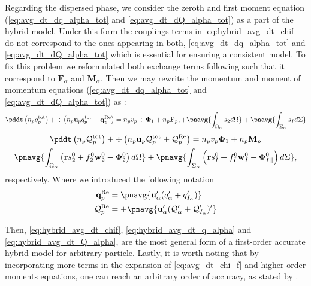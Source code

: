 Regarding the dispersed phase, we consider the zeroth and first moment equation (\ref{eq:avg_dt_dq_alpha_tot} and \ref{eq:avg_dt_dQ_alpha_tot}) as  a part of the hybrid model.
Under this form the couplings terms in \ref{eq:hybrid_avg_dt_chif} do not correspond to the ones appearing in both, \ref{eq:avg_dt_dq_alpha_tot} and \ref{eq:avg_dt_dQ_alpha_tot} which is essential for ensuring a consistent model. 
To fix this problem we reformulated both exchange terms following \citet{zhang1997momentum} such that it correspond to $\mathbf{F}_\alpha$ and $\textbf{M}_\alpha$. 
Then we may rewrite the momentum and moment of momentum equations (\ref{eq:avg_dt_dq_alpha_tot} and \ref{eq:avg_dt_dQ_alpha_tot}) as : 
\begin{multline}
    \pddt \left(n_p q_p^\text{tot}\right)
    + \div \left(n_p\textbf{u}_p
    q_p^\text{tot} + 
    \textbf{q}_p^\text{Re}
    \right)
    = 
    n_p v_p  \div \mathbf{\Phi}_1 
    + n_p \textbf{F}_p,
    + \pnavg{\int_{\Omega_\alpha} s_2 d\Omega}
    + \pnavg{\int_{\Sigma_\alpha} s_I d\Sigma}
    \label{eq:hybrid_avg_dt_q_alpha}
\end{multline}
\begin{multline}
    \pddt \left(n_p \mathcal{Q}_p^\text{tot}\right)
    + \div \left(
        n_p \textbf{u}_p \mathcal{Q}_p^\text{tot}
    + \mathcal{Q}_p^\text{Re}
    \right)
    =
    n_p v_p \mathbf{\Phi}_1 
    + n_p \textbf{M}_p\\
    \pnavg{\int_{\Omega_\alpha} \left(
        \textbf{r} s_2^0         
        + f_2^0  \textbf{w}_2^0 
        - \mathbf{\Phi}_2^0
        \right) d\Omega}
        + \pnavg{\int_{\Sigma_\alpha} \left(
        \textbf{r}s_I^0
        + f_I^0 \textbf{w}_I^0
        - \mathbf{\Phi}_{I||}^0
    \right) d\Sigma},
    \label{eq:hybrid_avg_dt_Q_alpha}
\end{multline}
respectively. 
Where  we introduced the following notation
\begin{align*}
    \textbf{q}_p^\text{Re}
    &= 
    \pnavg{\textbf{u}_\alpha'(q_\alpha'+q_{I_\alpha}')} \\
    \mathcal{Q}_p^\text{Re}
    &= 
    + \pnavg{\textbf{u}_\alpha'(\mathcal{Q}_\alpha'+\mathcal{Q}_{I_\alpha}')'}
\end{align*}

Then, \ref{eq:hybrid_avg_dt_chif}, \ref{eq:hybrid_avg_dt_q_alpha} and \ref{eq:hybrid_avg_dt_Q_alpha}, are the most general form of a first-order accurate hybrid model for arbitrary particle. 
Lastly, it is worth noting that by incorporating more terms in the expansion of \ref{eq:avg_dt_chi_f} and higher order moments equations, one can reach an arbitrary order of accuracy, as stated by \citet{zhang1997momentum}. 


